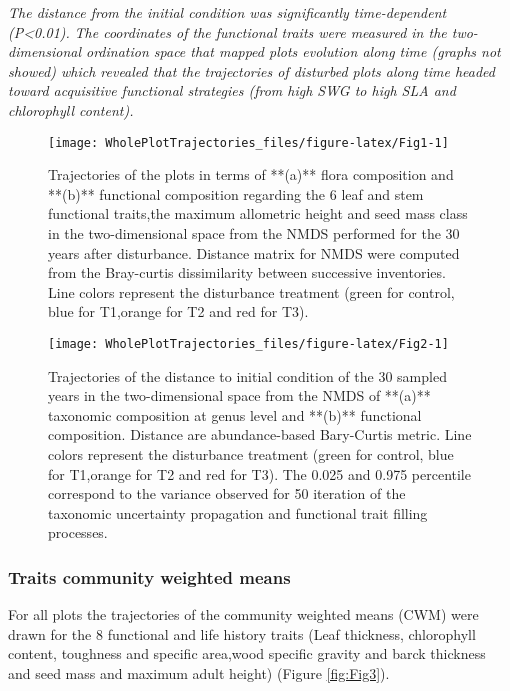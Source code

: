 \documentclass[fleqn,10pt]{ArtEcoFoG} %
\theoremstyle{definition}
\theoremstyle{definition}
\theoremstyle{definition}
\theoremstyle{remark}
\begin{document}
\emph{The distance from the initial condition was significantly
time-dependent (P\textless{}0.01).} \emph{The coordinates of the
functional traits were measured in the two-dimensional ordination space
that mapped plots evolution along time (graphs not showed) which
revealed that the trajectories of disturbed plots along time headed
toward acquisitive functional strategies (from high SWG to high SLA and
chlorophyll content).}

\begin{figure*}

{\centering \texttt{[image: WholePlotTrajectories\_files/figure-latex/Fig1-1]} 

}

\caption{Trajectories of the plots in terms of **(a)** flora composition and **(b)** functional composition regarding the 6 leaf and stem functional traits,the maximum allometric height and seed mass class in the two-dimensional space from the NMDS performed for the 30 years after disturbance. Distance matrix for NMDS were computed from the Bray-curtis dissimilarity between successive inventories. Line colors represent the disturbance treatment (green for control, blue for T1,orange for T2 and red for T3).}\label{fig:Fig1}
\end{figure*}

\begin{figure}

{\centering \texttt{[image: WholePlotTrajectories\_files/figure-latex/Fig2-1]} 

}

\caption{Trajectories of the distance to initial condition of the 30 sampled years in the two-dimensional space from the NMDS of **(a)** taxonomic composition at genus level and **(b)** functional composition. Distance are abundance-based Bary-Curtis metric. Line colors represent the disturbance treatment (green for control, blue for T1,orange for T2 and red for T3). The 0.025 and 0.975 percentile correspond to the variance observed for 50 iteration of the taxonomic uncertainty propagation and functional trait filling processes. }\label{fig:Fig2}
\end{figure}

\subsubsection{Traits community weighted
means}\label{traits-community-weighted-means}

For all plots the trajectories of the community weighted means (CWM)
were drawn for the 8 functional and life history traits (Leaf thickness,
chlorophyll content, toughness and specific area,wood specific gravity
and barck thickness and seed mass and maximum adult height) (Figure
\ref{fig:Fig3}).
\end{document}
